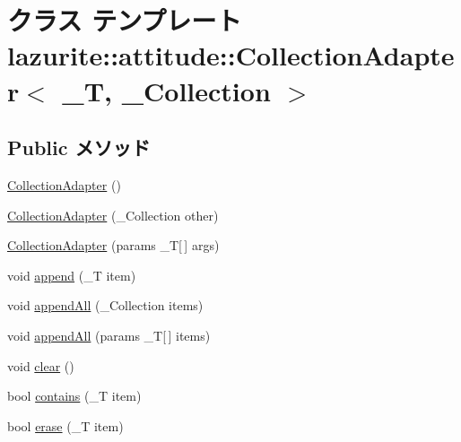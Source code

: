 \hypertarget{classlazurite_1_1attitude_1_1_collection_adapter_3_01___t_00_01___collection_01_4}{
\section{クラス テンプレート lazurite::attitude::CollectionAdapter$<$ \_\-T, \_\-Collection $>$}
\label{classlazurite_1_1attitude_1_1_collection_adapter_3_01___t_00_01___collection_01_4}
}
\subsection*{Public メソッド}
\begin{DoxyCompactItemize}
\item 
\hyperlink{classlazurite_1_1attitude_1_1_collection_adapter_3_01___t_00_01___collection_01_4_a582a6fdefe2ce5009133aca0ca88fdae}{CollectionAdapter} ()
\item 
\hyperlink{classlazurite_1_1attitude_1_1_collection_adapter_3_01___t_00_01___collection_01_4_a0c11c94e8d15aa12c8a933dc3a4613e1}{CollectionAdapter} (\_\-Collection other)
\item 
\hyperlink{classlazurite_1_1attitude_1_1_collection_adapter_3_01___t_00_01___collection_01_4_aaad30d466620c011afbc38890a7902ad}{CollectionAdapter} (params \_\-T\mbox{[}$\,$\mbox{]} args)
\item 
void \hyperlink{classlazurite_1_1attitude_1_1_collection_adapter_3_01___t_00_01___collection_01_4_a6b26e05bd526881846bd66c016c770c7}{append} (\_\-T item)
\item 
void \hyperlink{classlazurite_1_1attitude_1_1_collection_adapter_3_01___t_00_01___collection_01_4_ab3ef3ebb80d1bebc281cb18762135ab2}{appendAll} (\_\-Collection items)
\item 
void \hyperlink{classlazurite_1_1attitude_1_1_collection_adapter_3_01___t_00_01___collection_01_4_abc43f199f098dec49c87c2df2c20757a}{appendAll} (params \_\-T\mbox{[}$\,$\mbox{]} items)
\item 
void \hyperlink{classlazurite_1_1attitude_1_1_collection_adapter_3_01___t_00_01___collection_01_4_af9174ebfebc8d4a3a01124a588ec63d7}{clear} ()
\item 
bool \hyperlink{classlazurite_1_1attitude_1_1_collection_adapter_3_01___t_00_01___collection_01_4_a4d1b63c2ba73439576582cfbbd32629c}{contains} (\_\-T item)
\item 
bool \hyperlink{classlazurite_1_1attitude_1_1_collection_adapter_3_01___t_00_01___collection_01_4_ac43266718a4dabb625053c881b2ae418}{erase} (\_\-T item)

\end{DoxyCompactItemize}
